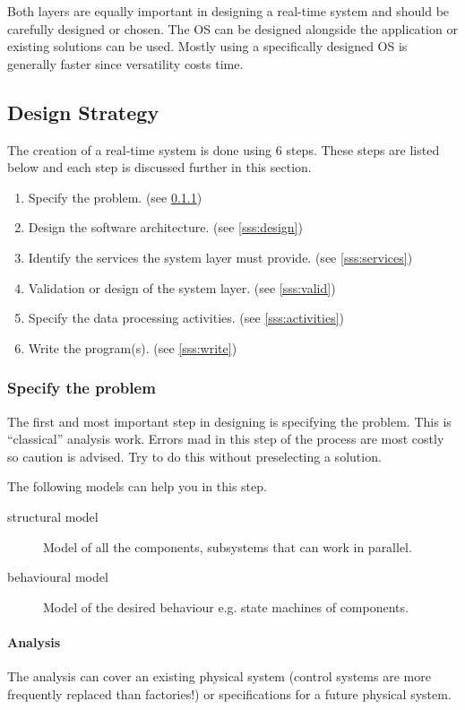 \documentclass[../main.tex]{subfiles}
\begin{document}
Both layers are equally important in designing a real-time system and should be carefully designed or chosen.
The OS can be designed alongside the application or existing solutions can be used. 
Mostly using a specifically designed OS is generally faster since versatility costs time.

\subsection{Design Strategy}
The creation of a real-time system is done using 6 steps. These steps are listed below and each step is discussed further in this section. 
\begin{enumerate}
	\item Specify the problem. (see \ref{sss:specify_problem})
	\item Design the software architecture. (see \ref{sss:design})
	\item Identify the services the system layer must provide. (see \ref{sss:services})
	\item Validation or design of the system layer. (see \ref{sss:valid})
	\item Specify the data processing activities. (see \ref{sss:activities})
	\item Write the program(s). (see \ref{sss:write})
\end{enumerate}




\subsubsection{Specify the problem}
\label{sss:specify_problem}
The first and most important step in designing is specifying the problem. This is ``classical'' analysis work.
Errors mad in this step of the process are most costly so caution is advised. 
Try to do this without preselecting a solution.

The following models can help you in this step.
\begin{description}
	\item[structural model] Model of all the components, subsystems that can work in parallel.
	\item[behavioural model] Model of the desired behaviour e.g. state machines of components. 
\end{description}

\paragraph{Analysis}
The analysis can cover an existing physical system (control systems are more frequently replaced than factories!) or specifications for a future physical system.
\end{document}

